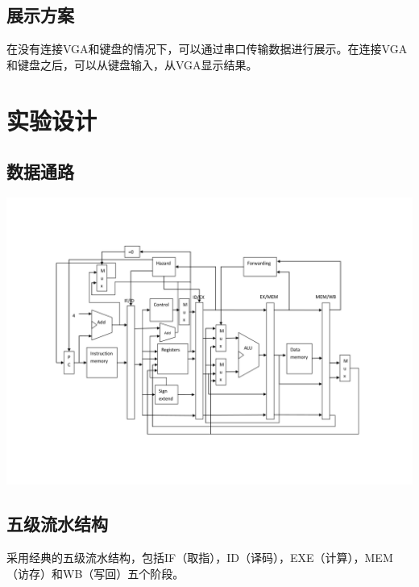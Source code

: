 \documentclass[10pt]{article}
\begin{document}
\subsection{展示方案}
在没有连接VGA和键盘的情况下，可以通过串口传输数据进行展示。在连接VGA和键盘之后，可以从键盘输入，从VGA显示结果。

\section{实验设计}
\subsection{数据通路}
\includegraphics[scale = 0.5]{数据通路.png}
\subsection{五级流水结构}
采用经典的五级流水结构，包括IF（取指），ID（译码），EXE（计算），MEM（访存）和WB（写回）五个阶段。
\end{document}
